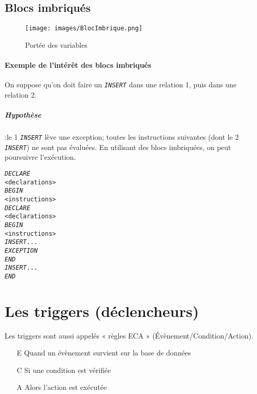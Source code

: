 \documentclass[10pt]{article}
\begin{document}
        \subsection{Blocs imbriqués}
            \begin{figure}[H]
                \begin{center}
                    \texttt{[image: images/BlocImbrique.png]}
                \end{center}
                \caption{Portée des variables}
            \end{figure}


            \paragraph{Exemple de l'intérêt des blocs imbriqués}
                On suppose qu'on doit faire un \emph{\texttt{INSERT}} dans une relation 1, puis dans une relation 2.

                \subparagraph{Hypothèse} :le 1 \emph{\texttt{INSERT}} lève une exception; toutes les instructions suivantes (dont le 2 \emph{\texttt{INSERT}}) ne sont pas évaluées. En utilisant des blocs imbriquées, on peut poursuivre l'exécution.

                \begin{alltt}
                    \begin{tabbing}
\emph{DECLARE}\=\\
    \><declarations>\\
\emph{BEGIN}\=\\
    \><instructions>\\
    \>\emph{DECLARE}\=\\
        \>\><declarations>\\
    \>\emph{BEGIN}\=\\
        \>\><instructions>\\
        \>\>\emph{INSERT} ...\\
    \>\emph{EXCEPTION}\\
    \>\emph{END}\\
    \>\emph{INSERT} ... \\
\emph{END}
                    \end{tabbing}
                \end{alltt}

    \section{Les triggers (déclencheurs)}
        Les triggers sont aussi appelés « règles ECA » (Évènement/Condition/Action).
        \begin{itemize}
            \item[E] Quand un évènement survient sur la base de données
            \item[C] Si une condition est vérifiée
            \item[A] Alors l'action est exécutée
        \end{itemize}
\end{document}
